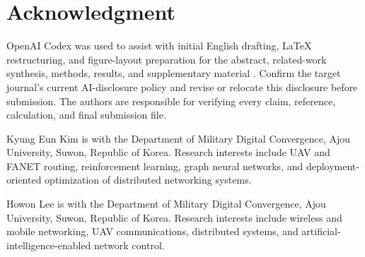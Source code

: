 \documentclass{ieeeaccess}
\newcommand{\MustEdit}[1]{\textcolor{ReviewRed}{#1}}
\begin{document}
\section*{Acknowledgment}
\MustEdit{OpenAI Codex was used to assist with initial English drafting, LaTeX restructuring, and figure-layout preparation for the abstract, related-work synthesis, methods, results, and supplementary material \cite{openai2026codex}. Confirm the target journal's current AI-disclosure policy and revise or relocate this disclosure before submission.} The authors are responsible for verifying every claim, reference, calculation, and final submission file.




\begin{IEEEbiographynophoto}{Kyung Eun Kim}
is with the Department of Military Digital Convergence, Ajou University, Suwon, Republic of Korea. Research interests include UAV and FANET routing, reinforcement learning, graph neural networks, and deployment-oriented optimization of distributed networking systems.
\end{IEEEbiographynophoto}

\begin{IEEEbiographynophoto}{Howon Lee}
is with the Department of Military Digital Convergence, Ajou University, Suwon, Republic of Korea. Research interests include wireless and mobile networking, UAV communications, distributed systems, and artificial-intelligence-enabled network control.
\end{IEEEbiographynophoto}

\EOD
\end{document}
